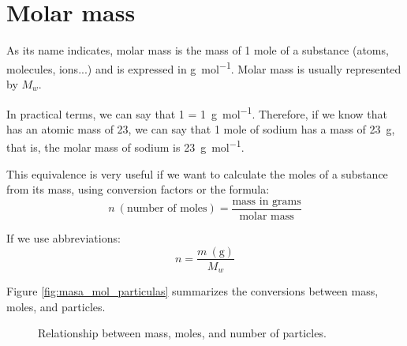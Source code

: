 \section{Molar mass}

As its name indicates, molar mass is the mass of 1 mole of a substance (atoms, molecules, ions...) and is expressed in \unit{\g\per\mole}. Molar mass is usually represented by \( M_w \).

In practical terms, we can say that \qty{1}{\uma} = \qty{1}{\g\per\mole}. Therefore, if we know that  has an atomic mass of \qty{23}{\uma}, we can say that 1 mole of sodium has a mass of \qty{23}{\g}, that is, the molar mass of sodium is \qty{23}{\g\per\mole}.

This equivalence is very useful if we want to calculate the moles of a substance from its mass, using conversion factors or the formula:
\begin{equation*}
    n\ (\text{number of moles}) = \dfrac{\text{mass in grams}}{\text{molar mass}}
\end{equation*}

If we use abbreviations:
\begin{equation*}
    n = \dfrac{m\ (\text{g})}{M_w}
\end{equation*}

Figure \eqref{fig:masa_mol_particulas} summarizes the conversions between mass, moles, and particles.

\begin{figure}[ht]
    \centering
    \caption{Relationship between mass, moles, and number of particles.}
    \label{fig:masa_mol_particulas}
\end{figure}

